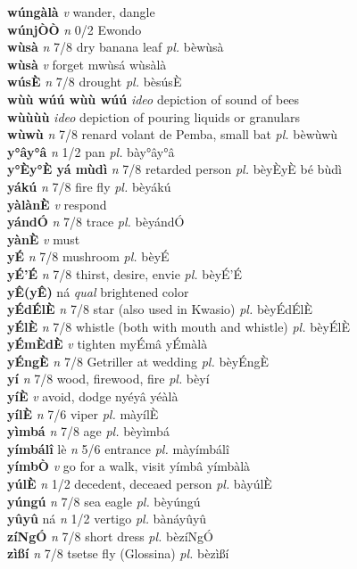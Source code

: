 \documentclass{article}
\begin{document}
{\bf wúngàlà}  {\it v} wander, dangle          \\ 
{\bf wúnjÒÒ}  {\it n} 0/2 Ewondo         \\ 
{\bf wùsà}  {\it n} 7/8 dry banana leaf {\it pl.} bèwùsà         \\ 
{\bf wùsà}  {\it v} forget   mwùsá   wùsàlà   \\ 
{\bf wúsÈ}  {\it n} 7/8 drought {\it pl.} bèsúsÈ         \\ 
{\bf wùù wúú wùù wúú}  {\it ideo} depiction of sound of bees         \\ 
{\bf wùùùù}  {\it ideo} depiction of pouring liquids or granulars         \\ 
{\bf wùwù}  {\it n} 7/8 renard volant de Pemba, small bat {\it pl.} bèwùwù         \\ 
{\bf y°ây°â}  {\it n} 1/2 pan {\it pl.} bày°ây°â         \\ 
{\bf y°Èy°È yá mùdì}  {\it n} 7/8 retarded person {\it pl.} bèyÈyÈ bé bùdì         \\ 
{\bf yákú}  {\it n} 7/8 fire fly {\it pl.} bèyákú         \\ 
{\bf yàlànÈ}  {\it v} respond         \\ 
{\bf yándÓ}  {\it n} 7/8 trace {\it pl.} bèyándÓ         \\ 
{\bf yànÈ}  {\it v} must         \\ 
{\bf yÉ}  {\it n} 7/8 mushroom  {\it pl.} bèyÉ         \\ 
{\bf yÉ'É}  {\it n} 7/8 thirst, desire, envie {\it pl.} bèyÉ'É         \\ 
{\bf yÊ(yÊ)} ná {\it qual} brightened color         \\ 
{\bf yÉdÉlÈ}  {\it n} 7/8 star (also used in Kwasio) {\it pl.} bèyÉdÉlÈ         \\ 
{\bf yÉlÈ}  {\it n} 7/8 whistle (both with mouth and whistle) {\it pl.} bèyÉlÈ         \\ 
{\bf yÉmÈdÈ}  {\it v} tighten   myÉmâ   yÉmàlà   \\ 
{\bf yÉngÈ}  {\it n} 7/8 Getriller at wedding {\it pl.} bèyÉngÈ         \\ 
{\bf yí}  {\it n} 7/8 wood, firewood, fire {\it pl.} bèyí         \\ 
{\bf yíÈ}  {\it v} avoid, dodge   nyéyâ   yéàlà   \\ 
{\bf yílÈ}  {\it n} 7/6 viper {\it pl.} màyílÈ         \\ 
{\bf yìmbá}  {\it n} 7/8 age {\it pl.} bèyìmbá         \\ 
{\bf yímbálî} lè {\it n} 5/6 entrance {\it pl.} màyímbálî         \\ 
{\bf yímbÒ}  {\it v} go for a walk, visit   yímbâ   yímbàlà   \\ 
{\bf yúlÈ}  {\it n} 1/2 decedent, deceaed person {\it pl.} bàyúlÈ         \\ 
{\bf yúngú}  {\it n} 7/8 sea eagle {\it pl.} bèyúngú         \\ 
{\bf yûyû} ná {\it n} 1/2 vertigo {\it pl.} bànáyûyû         \\ 
{\bf zíNgÓ}  {\it n} 7/8 short dress {\it pl.} bèzíNgÓ         \\ 
{\bf zìßí}  {\it n} 7/8 tsetse fly (Glossina) {\it pl.} bèzìßí         \\ 
\end{document}
